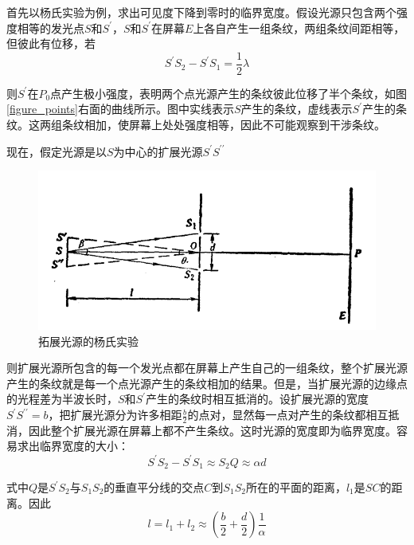 \documentclass[UTF8]{ctexart}
\begin{document}
	首先以杨氏实验为例，求出可见度下降到零时的临界宽度。假设光源只包含两个强度相等的发光点$ S $和$ S^{\prime} $，$ S $和$ S^{\prime} $在屏幕$ E $上各自产生一组条纹，两组条纹间距相等，但彼此有位移，若
	\begin{equation}
	S^{\prime} S_{2}-S^{\prime} S_{1}=\frac{1}{2} \lambda
	\end{equation}
	
\noindent 则$ S^{\prime} $在$ P_{0} $点产生极小强度，表明两个点光源产生的条纹彼此位移了半个条纹，如图\ref{figure_points}右面的曲线所示。图中实线表示$ S $产生的条纹，虚线表示$ S^{\prime} $产生的条纹。这两组条纹相加，使屏幕上处处强度相等，因此不可能观察到干涉条纹。
	
	现在，假定光源是以$ S $为中心的扩展光源$ S^{\prime}S^{\prime \prime} $
	
	\newpage
	\begin{figure}[ht]
		\centering
		\includegraphics[width=12cm]{extern_lights.png}
		\caption{拓展光源的杨氏实验}
		\label{figure_extern_lights}
	\end{figure}

\noindent 则扩展光源所包含的每一个发光点都在屏幕上产生自己的一组条纹，整个扩展光源产生的条纹就是每一个点光源产生的条纹相加的结果。但是，当扩展光源的边缘点的光程差为半波长时，$ S $和$ S^{\prime} $产生的条纹时相互抵消的。设扩展光源的宽度$ S^{\prime}S^{\prime \prime}=b $，把扩展光源分为许多相距$ \frac{b}{2} $的点对，显然每一点对产生的条纹都相互抵消，因此整个扩展光源在屏幕上都不产生条纹。这时光源的宽度即为临界宽度。容易求出临界宽度的大小：
	\begin{equation}
S^{\prime} S_{2}-S^{\prime} S_{1} \approx S_{2} Q \approx \alpha d
	\end{equation}

\noindent 式中$ Q $是$ S^{\prime}S_{2} $与$ S_{1}S_{2} $的垂直平分线的交点$ C $到$ S_{1}S_{2} $所在的平面的距离，$ l_{1} $是$ SC $的距离。因此
\begin{equation}
l=l_{1}+l_{2} \approx\left(\frac{b}{2}+\frac{d}{2}\right) \frac{1}{\alpha}
\end{equation}
\end{document}
